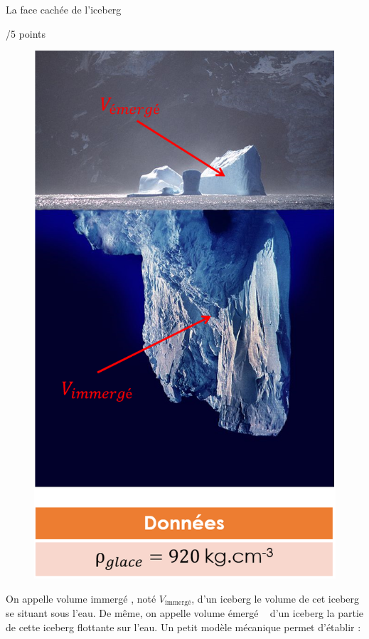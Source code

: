 \newpage
\begin{doc}{La face cachée de l'iceberg  \begin{Large}
    /5 points
\end{Large}}
\begin{figure}
\vspace{-1cm}
    \centering
      \includegraphics[scale=0.5]{Images/Iceberg.png}
  \end{figure}
On appelle \og volume immergé \fg, noté $V_{\text{immergé}}$, d'un iceberg le volume de cet iceberg se situant sous l'eau. De même, on appelle \og volume émergé \fg~ d'un iceberg la partie de cette iceberg flottante sur l'eau. Un petit modèle mécanique permet d'établir :

\end{doc}
